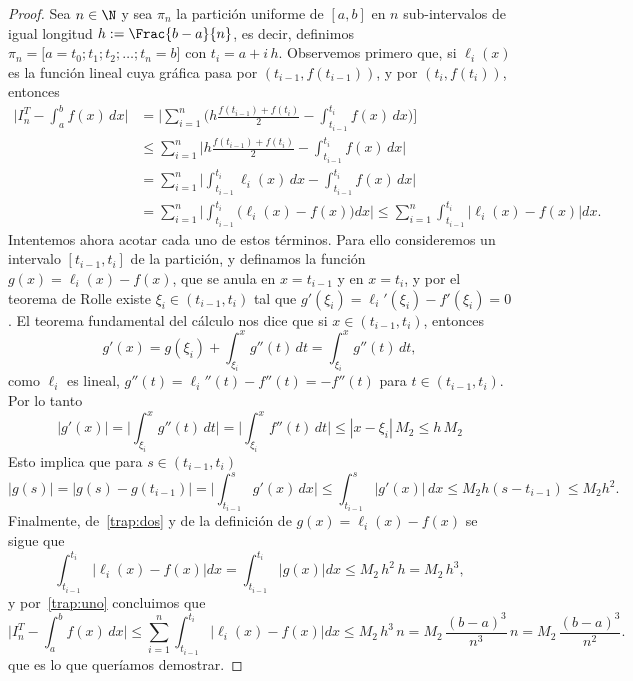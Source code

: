 \begin{proof}
 Sea $n \in \N$ y sea $\pi_n$ la partición uniforme de $[a,b]$ en $n$ sub-intervalos de igual longitud $h := \Frac{b-a}{n}$, es decir, definimos $\pi_n = \big[a = t_0; t_1; t_2; \dots ; t_n = b\big]$ con $t_i = a + i\, h$. Observemos primero que, si $\ell_i(x)$ es la función lineal cuya gráfica pasa por $(t_{i-1},f(t_{i-1}))$, y por $(t_i, f(t_i))$, entonces
\begin{equation}\label{trap:uno}
\begin{aligned} 
\Big| I_n^T - \int_a^b f(x) \, dx \Big|
&=  \bigg| \sum_{i=1}^n \Big( h \frac{f(t_{i-1})+f(t_i)}2 - \int_{t_{i-1}}^{t_i} f(x)\, dx \Big) \bigg] 
\\
&\le  \sum_{i=1}^n \Big| h \frac{f(t_{i-1})+f(t_i)}2 - \int_{t_{i-1}}^{t_i} f(x)\, dx \Big|
\\
&=    \sum_{i=1}^n \Big| \int_{t_{i-1}}^{t_i} \ell_i(x)\, dx - \int_{t_{i-1}}^{t_i} f(x)\, dx \Big|
\\
&=    \sum_{i=1}^n \Big| \int_{t_{i-1}}^{t_i} \big( \ell_i(x) - f(x) \big) dx \Big|
\le    \sum_{i=1}^n   \int_{t_{i-1}}^{t_i} \big| \ell_i(x) - f(x) \big| dx .
\end{aligned}
\end{equation}
Intentemos ahora acotar cada uno de estos términos. Para ello consideremos un intervalo $[t_{i-1}, t_i]$ de la partición, y definamos la función $g(x) = \ell_i(x)-f(x)$, que se anula en $x=t_{i-1}$ y en $x=t_i$, y por el teorema de Rolle existe $\xi_i \in (t_{i-1}, t_i)$ tal que $g'(\xi_i) = \ell_i'(\xi_i) - f'(\xi_i) = 0$. El teorema fundamental del cálculo nos dice que si $x \in (t_{i-1},t_i)$, entonces
\[
g'(x) = g(\xi_i) + \int_{\xi_i}^x g''(t) \, dt
  = \int_{\xi_i}^x g''(t)\, dt,
\]
como $\ell_i$ es lineal, $g''(t) = \ell_i''(t) - f''(t) = -f''(t)$ para $t \in (t_{i-1},t_i)$. Por lo tanto
\[
|g'(x)| = \Big|\int_{\xi_i}^x g''(t)\, dt \Big| = \Big|\int_{\xi_i}^x f''(t)\, dt \Big| \le |x-\xi_i| \, M_2 \le h \, M_2
\]
Esto implica que para $s \in (t_{i-1}, t_i)$
\begin{equation}\label{trap:dos}
 |g(s)| = |g(s) - g(t_{i-1})| = \Big| \int_{t_{i-1}}^s g'(x) \, dx \Big|
\le \int_{t_{i-1}}^s |g'(x)| \, dx \le M_2 h (s - t_{i-1}) \le M_2 h^2.
\end{equation}
Finalmente, de~\eqref{trap:dos} y de la definición de $g(x) = \ell_i(x) - f(x)$ se sigue que
\[
 \int_{t_{i-1}}^{t_i} \big| \ell_i(x) - f(x) \big| dx = \int_{t_{i-1}}^{t_i} \big| g(x) \big| dx
\le M_2 \, h^2 \, h = M_2 \, h^3,
\]
y por~\eqref{trap:uno} concluimos que
\[
 \Big| I_n^T - \int_a^b f(x) \, dx \Big| \le \sum_{i=1}^n \int_{t_{i-1}}^{t_i} \big| \ell_i(x) - f(x) \big| dx
\le M_2 \, h^3 \, n = M_2 \, \frac{(b-a)^3}{n^3} \, n = M_2 \, \frac{(b-a)^3}{n^2}.
\]
que es lo que queríamos demostrar.
\end{proof}

